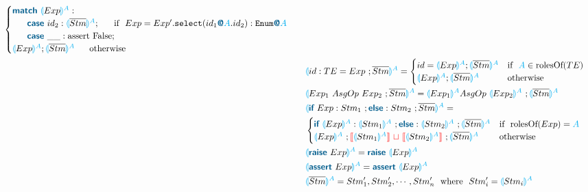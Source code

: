 \documentclass{thesis}
\newcommand{\projection}[2]{{\color{cyan}\llparenthesis}#1{\color{cyan}\rrparenthesis^#2}}
\newcommand{\mblue}[1]{\textbf{\textsf{\color{MidnightBlue}#1}}}
\newcommand{\cyan}[1]{\color{cyan}#1}
\newcommand{\nl}[1]{{\color{red}{\llbracket}}#1{\color{red}{\rrbracket}}} %
\newcommand{\mg}{~{\color{red}{\sqcup}}~} %
\begin{document}
\begin{alignat*}{2}
  \begin{cases}
    \mblue{match} ~\projection{Exp}{A}: \\
    ~~~~~\mblue{case} ~id_2: \projection{\overline{Stm}}{A};~~~~~ \text{if}~~Exp = Exp'.\texttt{select}(id_1\mblue{@}{\cyan{A}}.id_2):\texttt{Enum}\mblue{@}{\cyan{A}}\\ %
    ~~~~~\mblue{case} ~\_\_: \text{assert False}; \\
    \projection{Exp}{A};\projection{\overline{Stm}}{A} ~~~~~ \text{otherwise}\\
  \end{cases}\\
  &&& \projection{id:TE = Exp~;\overline{Stm}}{A} =
  \begin{cases}
    id = \projection{Exp}{A};\projection{\overline{Stm}}{A} & \text{if}~~ {\color{cyan}A} \in \text{rolesOf}(TE)\\
    \projection{Exp}{A};\projection{\overline{Stm}}{A} & \text{otherwise}
  \end{cases}\\
  &&& \projection{Exp_1 ~AsgOp~ Exp_2 ~; \overline{Stm}}{A} = \projection{Exp_1}{A} AsgOp~ \projection{Exp_2}{A} ~; \projection{\overline{Stm}}{A} \\
  &&&\projection{\mblue{if}~Exp:Stm_1~;\mblue{else}:Stm_2 ~;\overline{Stm}}{A}=\\
  &&&
  \begin{cases}
    \mblue{if}~\projection{Exp}{A} : \projection{Stm_1}{A} ~; \mblue{else}:\projection{Stm_2}{A} ~;\projection{\overline{Stm}}{A} & \text{if}~~ \text{rolesOf}(Exp) = \cyan{A}\\
    \projection{Exp}{A} ~; \nl{\projection{Stm_1}{A}} \mg \nl{\projection{Stm_2}{A}} ~;\projection{\overline{Stm}}{A} & \text{otherwise}
  \end{cases}\\
  &&&\projection{\mblue{raise}~Exp}{A} = \mblue{raise}~\projection{Exp}{A}\\
  &&&\projection{\mblue{assert}~Exp}{A} = \mblue{assert}~\projection{Exp}{A}\\
  &&&\projection{\overline{Stm}}{A} = Stm'_1,Stm'_2,\cdots,Stm'_n ~~\text{where}~~ Stm'_i = \projection{Stm_i}{A}\\  
\end{alignat*}
\end{document}
